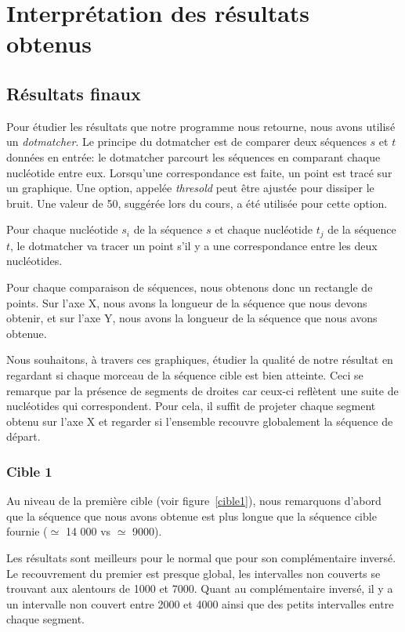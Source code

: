 
\section{Interprétation des résultats obtenus}

\subsection{Résultats finaux}

Pour étudier les résultats que notre programme nous retourne, nous avons utilisé
un \textit{dotmatcher}.
Le principe du dotmatcher est de comparer deux séquences $s$ et $t$ données en
entrée: le dotmatcher parcourt les séquences en comparant chaque nucléotide
entre eux.  Lorsqu'une correspondance est faite, un point est tracé sur un
graphique. Une option, appelée \textit{thresold} peut être ajustée pour dissiper
le bruit. Une valeur de 50, suggérée lors du cours, a été utilisée pour cette
option.

Pour chaque nucléotide $s_{i}$ de la séquence $s$ et chaque nucléotide $t_{j}$
de la séquence $t$, le dotmatcher va tracer un point s'il y a une correspondance
entre les deux nucléotides.

Pour chaque comparaison de séquences, nous obtenons donc un rectangle de
points. Sur l'axe X, nous avons la longueur de la séquence que nous devons
obtenir, et sur l'axe Y, nous avons la longueur de la séquence que nous avons
obtenue.

Nous souhaitons, à travers ces graphiques, étudier la qualité de notre
résultat en regardant si chaque morceau de la séquence cible est bien
atteinte. Ceci se remarque par la présence de segments de droites car ceux-ci
reflètent une suite de nucléotides qui correspondent. Pour cela, il
suffit de projeter chaque segment obtenu sur l'axe X et regarder si l'ensemble
recouvre globalement la séquence de départ.

\subsubsection*{Cible 1}

Au niveau de la première cible (voir figure~\ref{cible1}), nous remarquons d'abord que la séquence que nous
avons obtenue est plus longue que la séquence cible fournie ($\simeq$ 14 000 vs
$\simeq$ 9000).

Les résultats sont meilleurs pour le normal que pour son complémentaire
inversé. Le recouvrement du premier est presque global, les intervalles non
couverts se trouvant aux alentours de 1000 et 7000. Quant au complémentaire
inversé, il y a un intervalle non couvert entre 2000 et 4000 ainsi que des
petits intervalles entre chaque segment.

